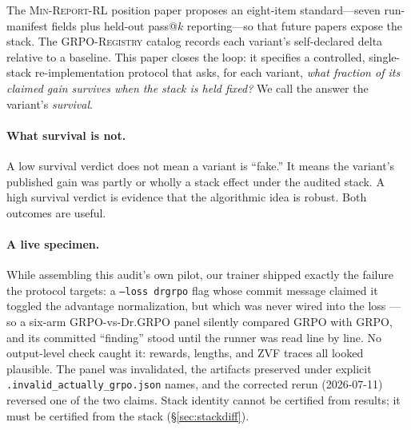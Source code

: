 \documentclass[11pt]{article}
\newcommand{\minreport}{\textsc{Min-Report-RL}}
\newcommand{\grpoReg}{\textsc{GRPO-Registry}}
\begin{document}
The \minreport{} position paper \cite{minreportrl2026} proposes an eight-item
standard---seven run-manifest fields plus held-out pass@$k$ reporting---so that future papers expose the
stack. The \grpoReg{} catalog \cite{grpoRegistry2026} records each variant's
self-declared delta relative to a baseline. This paper closes the loop: it
specifies a controlled, single-stack re-implementation protocol that asks,
for each variant, \emph{what fraction of its claimed gain survives when the
stack is held fixed?} We call the answer the variant's \emph{survival}.

\paragraph{What survival is not.} A low survival verdict does not mean a
variant is ``fake.'' It means the variant's published gain was partly or wholly
a stack effect under the audited stack. A high survival verdict is evidence
that the algorithmic idea is robust. Both outcomes are useful.

\paragraph{A live specimen.} While assembling this audit's own pilot, our
trainer shipped exactly the failure the protocol targets: a
\texttt{--loss drgrpo} flag whose commit message claimed it toggled the
advantage normalization, but which was never wired into the loss --- so a
six-arm GRPO-vs-Dr.GRPO panel silently compared GRPO with GRPO, and its
committed ``finding'' stood until the runner was read line by line. No
output-level check caught it: rewards, lengths, and ZVF traces all looked
plausible. The panel was invalidated, the artifacts preserved under
explicit \texttt{.invalid\_actually\_grpo.json} names, and the corrected
rerun (2026-07-11) reversed one of the two claims. Stack identity cannot
be certified from results; it must be certified from the stack
(\S\ref{sec:stackdiff}).
\end{document}
